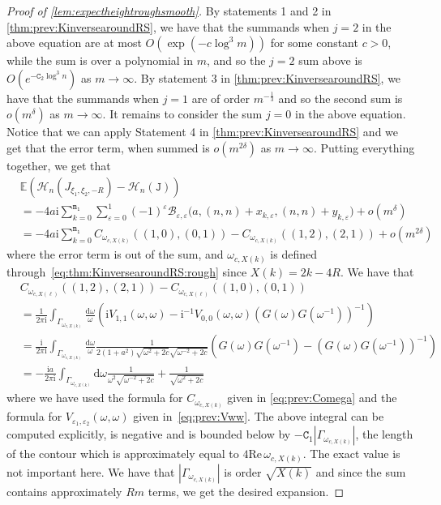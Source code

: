 \documentclass[11pt,twoside]{amsart}
\theoremstyle{plain}
\numberwithin{quest}{section}
\theoremstyle{remark}
\numberwithin{rem}{section}
\theoremstyle{definition}
\newcommand{\eps}{\varepsilon}
\begin{document}
\begin{proof}[Proof of \cref{lem:expectheightroughsmooth}]
		By statements 1 and 2 in \cref{thm:prev:KinversearoundRS}, we have that the summands when $j=2$  in the above equation are at most $O(\exp(-c\log^3 m))$ for some constant $c > 0$, while the sum is over a polynomial in $m$, and so the $j=2$ sum above is $O(e^{-\mathtt{C}_2 \log^3 n})$ as $m\to \infty$. 
		By statement 3 in \cref{thm:prev:KinversearoundRS}, we have that the summands when $j=1$ are of order $m^{-\frac{1}{3}}$ and so the second sum is $o(m^{\delta})$ as $m\to \infty$. 
		It remains to consider the sum $j=0$ in the above equation. Notice that we can apply Statement 4 in \cref{thm:prev:KinversearoundRS} and we get that the error term, when summed is $o(m^{2\delta})$ as $m\to \infty$. Putting everything together, we get that
		\begin{equation*}
			\begin{split}
				&\mathbb{E}(\mathcal{H}_n(J_{\xi_1,\xi_2,-R})-\mathcal{H}_n(\mathtt{J}))\\
                &=-4a \mathrm{i}\sum_{k=0}^{\mathtt{m_1}} \sum_{\eps=0}^1 (-1)^{\eps}  \mathcal{B}_{\eps,\eps}\big(a, (n,n)+x_{k, \eps},(n,n)+y_{k, \eps} \big)+o(m^\delta)\\
				&=-4a \mathrm{i}\sum_{k=0}^{\mathtt{m_1}}C_{\omega_{c,X(k)}}((1,0),(0,1)) -C_{\omega_{c,X(k)}}((1,2),(2,1))  +o(m^{2\delta})
			\end{split}
		\end{equation*}
		where the error term is out of the sum, and $\omega_{c,X(k)}$ is defined through~\eqref{eq:thm:KinversearoundRS:rough} since $X(k)=2k-4R$. 
		We have that 
		\begin{equation*}
			\begin{split}
				&C_{\omega_{c,X(\ell)}}((1,2),(2,1))-C_{\omega_{c,X(\ell)}}((1,0),(0,1))\\
				&=\frac{1}{2 \pi \mathrm{i}} \int_{\Gamma_{\omega_{c,X(k)}}} \frac{\mathrm{d}\omega}{\omega} (\mathrm{i} V_{1,1}(\omega,\omega)-\mathrm{i}^{-1} V_{0,0}(\omega,\omega) (G(\omega) G(\omega^{-1}))^{-1}) \\
				&=\frac{\mathrm{i}}{2 \pi \mathrm{i}} \int_{\Gamma_{\omega_{c,X(k)}}} \frac{\mathrm{d}\omega}{\omega } \frac{1}{2(1+a^2)\sqrt{\omega^2+2c}\sqrt{\omega^{-2}+2c}} (G(\omega)G(\omega^{-1}) -(G(\omega)G(\omega^{-1}))^{-1})\\
				&=-\frac{\mathrm{i}a}{2 \pi \mathrm{i}} \int_{\Gamma_{\omega_{c,X(k)}}} {\mathrm{d}\omega}\frac{ 1}{\omega^2 \sqrt{\omega^{-2}+2c}} +\frac{1}{\sqrt{\omega^2+2c}}
			\end{split}
		\end{equation*}
		where we have used the formula for $C_{\omega_{c,X(k)}}$ given in \eqref{eq:prev:Comega} and the formula for $V_{\eps_1,\eps_2}(\omega,\omega)$ given in~\eqref{eq:prev:Vww}. The above integral can be computed explicitly, is negative and is bounded below by  $-\mathtt{C}_1|\Gamma_{\omega_{c,X(k)}}|$, the length of the contour which is approximately equal to $4\mathrm{Re}\,\omega_{c,X(k)}$.  The exact value is not important here. We have that $|\Gamma_{\omega_{c,X(k)}}|$ is order $\sqrt{X(k)}$ and since the sum contains approximately $Rm$ terms, we get the desired expansion. 
	\end{proof}
	
\end{document}
